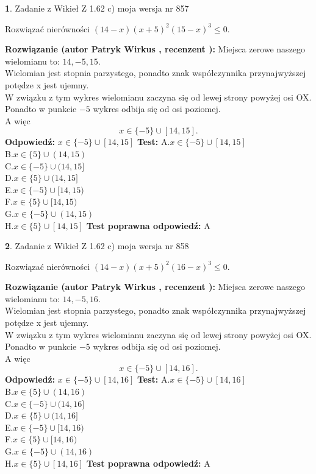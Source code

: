 \documentclass[12pt, a4paper]{article}
\theoremstyle{definition} %
\newtheorem{zad}{}
\newcommand{\zadStart}[1]{\begin{zad}#1\newline}
\newcommand{\zadStop}{\end{zad}}
\newcommand{\rozwStart}[2]{\noindent \textbf{Rozwiązanie (autor #1 , recenzent #2): }\newline}
\newcommand{\rozwStop}{\newline}
\newcommand{\odpStart}{\noindent \textbf{Odpowiedź:}\newline}
\newcommand{\odpStop}{\newline}
\newcommand{\testStart}{\noindent \textbf{Test:}\newline}
\newcommand{\testStop}{\newline}
\newcommand{\kluczStart}{\noindent \textbf{Test poprawna odpowiedź:}\newline}
\newcommand{\kluczStop}{\newline}
\begin{document}
\zadStart{Zadanie z Wikieł Z 1.62 c) moja wersja nr 857}

Rozwiązać nierówności $(14-x)(x+5)^{2}(15-x)^{3}\le0$.
\zadStop
\rozwStart{Patryk Wirkus}{}
Miejsca zerowe naszego wielomianu to: $14, -5, 15$.\\
Wielomian jest stopnia parzystego, ponadto znak współczynnika przy\linebreak najwyższej potędze x jest ujemny.\\ W związku z tym wykres wielomianu zaczyna się od lewej strony powyżej osi OX.\\
Ponadto w punkcie $-5$ wykres odbija się od osi poziomej.\\
A więc $$x \in \{-5\} \cup [14,15].$$
\rozwStop
\odpStart
$x \in \{-5\} \cup [14,15]$
\odpStop
\testStart
A.$x \in \{-5\} \cup [14,15]$\\
B.$x \in \{5\} \cup (14,15)$\\
C.$x \in \{-5\} \cup (14,15]$\\
D.$x \in \{5\} \cup (14,15]$\\
E.$x \in \{-5\} \cup [14,15)$\\
F.$x \in \{5\} \cup [14,15)$\\
G.$x \in \{-5\} \cup (14,15)$\\
H.$x \in \{5\} \cup [14,15]$
\testStop
\kluczStart
A
\kluczStop



\zadStart{Zadanie z Wikieł Z 1.62 c) moja wersja nr 858}

Rozwiązać nierówności $(14-x)(x+5)^{2}(16-x)^{3}\le0$.
\zadStop
\rozwStart{Patryk Wirkus}{}
Miejsca zerowe naszego wielomianu to: $14, -5, 16$.\\
Wielomian jest stopnia parzystego, ponadto znak współczynnika przy\linebreak najwyższej potędze x jest ujemny.\\ W związku z tym wykres wielomianu zaczyna się od lewej strony powyżej osi OX.\\
Ponadto w punkcie $-5$ wykres odbija się od osi poziomej.\\
A więc $$x \in \{-5\} \cup [14,16].$$
\rozwStop
\odpStart
$x \in \{-5\} \cup [14,16]$
\odpStop
\testStart
A.$x \in \{-5\} \cup [14,16]$\\
B.$x \in \{5\} \cup (14,16)$\\
C.$x \in \{-5\} \cup (14,16]$\\
D.$x \in \{5\} \cup (14,16]$\\
E.$x \in \{-5\} \cup [14,16)$\\
F.$x \in \{5\} \cup [14,16)$\\
G.$x \in \{-5\} \cup (14,16)$\\
H.$x \in \{5\} \cup [14,16]$
\testStop
\kluczStart
A
\kluczStop
\end{document}
